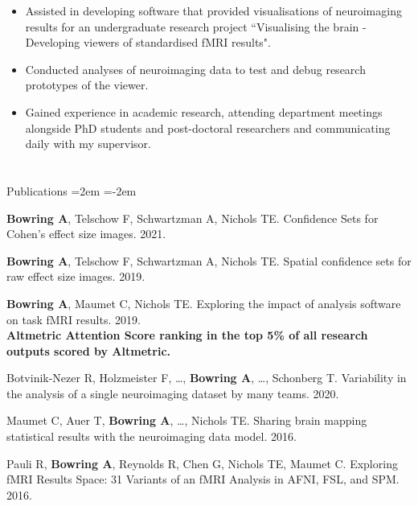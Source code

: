 \documentclass{my_cv}
\begin{document}
%
    {\uline{ \hfill {}}}%
    {\begin{itemize}[topsep=0pt,itemsep=0pt,partopsep=0pt, parsep=0pt] 
    \item Assisted in developing software that provided visualisations of neuroimaging results for an undergraduate research project ``Visualising the brain - Developing viewers of standardised fMRI results". 
    \item Conducted analyses of neuroimaging data to test and debug research prototypes of the viewer. 
    \item Gained experience in academic research, attending department meetings alongside PhD students and post-doctoral researchers and communicating daily with my supervisor.
    \end{itemize}
    }%
    
\section{\faBook}{Publications}
\leftskip=2em
\parindent=-2em

\hspace{-2em}\textbf{Bowring A}, Telschow F, Schwartzman A, Nichols TE. Confidence Sets for Cohen's  effect size images.  2021. 

\textbf{Bowring A}, Telschow F, Schwartzman A, Nichols TE. Spatial confidence sets for raw effect size images.  2019. 

\textbf{Bowring A}, Maumet C, Nichols TE. Exploring the impact of analysis software on task fMRI results.  2019.\\
\textbf{Altmetric Attention Score ranking in the top 5\% of all research outputs scored by Altmetric.}

Botvinik-Nezer R, Holzmeister  F, \dots, \textbf{Bowring A}, \dots, Schonberg T. Variability in the analysis of a single neuroimaging dataset by many teams.  2020. 

Maumet C, Auer T, \textbf{Bowring A}, \dots, Nichols TE. Sharing brain mapping statistical results with the neuroimaging data model.  2016.

Pauli R, \textbf{Bowring A}, Reynolds R, Chen G, Nichols TE, Maumet C. Exploring fMRI Results Space: 31 Variants of an fMRI Analysis in AFNI, FSL, and SPM.  2016.
\end{document}
